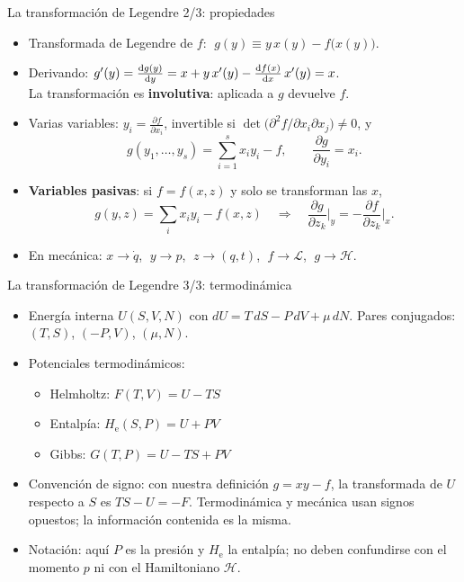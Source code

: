 \documentclass[spanish]{beamer}
\newcommand{\Lag}{\mathcal{L}}               %
\newcommand{\Ham}{\mathcal{H}}               %
\newcommand{\pd}[2]{\frac{\partial #1}{\partial #2}}
\begin{document}
\begin{frame}{La transformación de Legendre 2/3: propiedades}
\begin{itemize}[<+->]
  \item Transformada de Legendre de $f$:
        $\; g(y)\equiv y\,x(y)-f\big(x(y)\big)$.
  \item Derivando: $g'(y) = \frac{{\rm d}g(y)}{{\rm d}y} =x+y\,x'(y)-\frac{{\rm d}f(x)}{{\rm d}x}\,x'(y)=x$. \\
        La transformación es \textbf{involutiva}: aplicada a $g$ devuelve $f$.
  \item Varias variables: $y_i=\pd{f}{x_i}$, invertible si
        $\det\big(\partial^2 f/\partial x_i\partial x_j\big)\neq0$, y
        \[
          g(y_1,\dots,y_s)=\sum_{i=1}^s x_i y_i-f,\qquad \pd{g}{y_i}=x_i .
        \]
  \item \textbf{Variables pasivas}: si $f=f(x,z)$ y solo se transforman las $x$,
        \[
          g(y,z)=\sum_i x_i y_i-f(x,z)\quad\Rightarrow\quad
          \pd{g}{z_k}\Big|_{y}=-\pd{f}{z_k}\Big|_{x}.
        \]
  \item En mecánica: $x\to\dot q$, $\;y\to p$, $\;z\to(q,t)$, $\;f\to\Lag$, $\;g\to\Ham$.
\end{itemize}
\end{frame}

\begin{frame}{La transformación de Legendre 3/3: termodinámica}
\begin{itemize}[<+->]
  \item Energía interna $U(S,V,N)$ con $dU=T\,dS-P\,dV+\mu\,dN$.
        Pares conjugados: $(T,S)$, $(-P,V)$, $(\mu,N)$.
  \item Potenciales termodinámicos:
        \begin{itemize}
          \item Helmholtz: $F(T,V)=U-TS$
          \item Entalpía: $H_{\mathrm e}(S,P)=U+PV$
          \item Gibbs: $G(T,P)=U-TS+PV$
        \end{itemize}
  \item \alert{Convención de signo:} con nuestra definición $g=xy-f$, la transformada
        de $U$ respecto a $S$ es $TS-U=-F$. Termodinámica y mecánica usan signos
        opuestos; la información contenida es la misma.
  \item \alert{Notación:} aquí $P$ es la presión y $H_{\mathrm e}$ la entalpía;
        no deben confundirse con el momento $p$ ni con el Hamiltoniano $\Ham$.
\end{itemize}
\end{frame}
\end{document}
